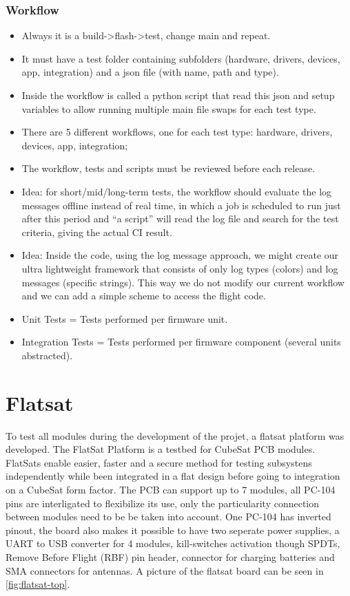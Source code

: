 \subsubsection{Workflow}

\begin{itemize} \setlength\itemsep{-0.3em}
    \item Always it is a build->flash->test, change main and repeat.
    \item It must have a test folder containing subfolders (hardware, drivers, devices, app, integration) and a json file (with name, path and type).
    \item Inside the workflow is called a python script that read this json and setup variables to allow running multiple main file swaps for each test type.
    \item There are 5 different workflows, one for each test type: hardware, drivers, devices, app, integration;
    \item The workflow, tests and scripts must be reviewed before each release.
    \item Idea: for short/mid/long-term tests, the workflow should evaluate the log messages offline instead of real time, in which a job is scheduled to run just after this period and ``a script'' will read the log file and search for the test criteria, giving the actual CI result.
    \item Idea: Inside the code, using the log message approach, we might create our ultra lightweight framework that consists of only log types (colors) and log messages (specific strings). This way we do not modify our current workflow and we can add a simple scheme to access the flight code.
    \item Unit Tests = Tests performed per firmware unit.
    \item Integration Tests = Tests performed per firmware component (several units abstracted).
\end{itemize}



\section{Flatsat}

To test all modules during the development of the projet, a flatsat platform was developed. The FlatSat Platform is a testbed for CubeSat PCB modules. FlatSats enable easier, faster and a secure method for testing subsystens independently while been integrated in a flat design before going to integration on a CubeSat form factor. The PCB can support up to 7 modules, all PC-104 pins are interligated to flexibilize its use, only the particularity connection between modules need to be be taken into account. One PC-104 has inverted pinout, the board also makes it possible to have two seperate power supplies, a UART to USB converter for 4 modules, kill-switches activation though SPDTs, Remove Before Flight (RBF) pin header, connector for charging batteries and SMA connectors for antennas. A picture of the flatsat board can be seen in \autoref{fig:flatsat-top}.

